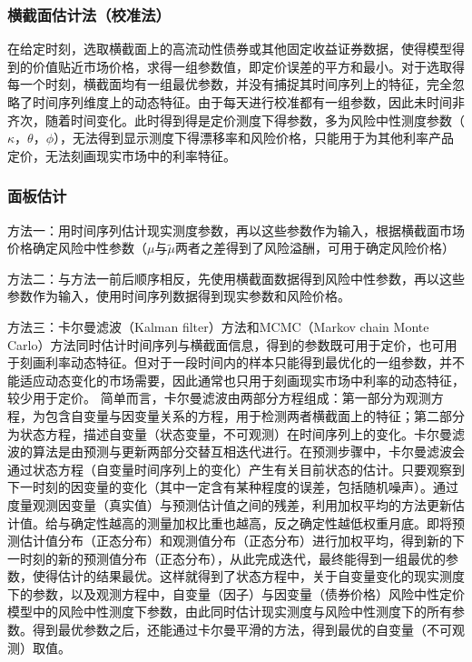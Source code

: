 \documentclass[11pt]{article}
\begin{document}
\subsubsection{横截面估计法（校准法）}

在给定时刻，选取横截面上的高流动性债券或其他固定收益证券数据，使得模型得到的价值贴近市场价格，求得一组参数值，即定价误差的平方和最小。对于选取得每一个时刻，横截面均有一组最优参数，并没有捕捉其时间序列上的特征，完全忽略了时间序列维度上的动态特征。由于每天进行校准都有一组参数，因此未时间非齐次，随着时间变化。此时得到得是定价测度下得参数，多为风险中性测度参数（$\kappa$，$\theta$，$\phi$），无法得到显示测度下得漂移率和风险价格，只能用于为其他利率产品定价，无法刻画现实市场中的利率特征。

\subsubsection{面板估计}

方法一：用时间序列估计现实测度参数，再以这些参数作为输入，根据横截面市场价格确定风险中性参数（$\mu$与$\tilde{\mu}$两者之差得到了风险溢酬，可用于确定风险价格）

方法二：与方法一前后顺序相反，先使用横截面数据得到风险中性参数，再以这些参数作为输入，使用时间序列数据得到现实参数和风险价格。

方法三：卡尔曼滤波（Kalman filter）方法和MCMC（Markov chain Monte Carlo）方法同时估计时间序列与横截面信息，得到的参数既可用于定价，也可用于刻画利率动态特征。但对于一段时间内的样本只能得到最优化的一组参数，并不能适应动态变化的市场需要，因此通常也只用于刻画现实市场中利率的动态特征，较少用于定价。
简单而言，卡尔曼滤波由两部分方程组成：第一部分为观测方程，为包含自变量与因变量关系的方程，用于检测两者横截面上的特征；第二部分为状态方程，描述自变量（状态变量，不可观测）在时间序列上的变化。卡尔曼滤波的算法是由预测与更新两部分交替互相迭代进行。在预测步骤中，卡尔曼滤波会通过状态方程（自变量时间序列上的变化）产生有关目前状态的估计。只要观察到下一时刻的因变量的变化（其中一定含有某种程度的误差，包括随机噪声）。通过度量观测因变量（真实值）与预测估计值之间的残差，利用加权平均的方法更新估计值。给与确定性越高的测量加权比重也越高，反之确定性越低权重月底。即将预测估计值分布（正态分布）和观测值分布（正态分布）进行加权平均，得到新的下一时刻的新的预测值分布（正态分布），从此完成迭代，最终能得到一组最优的参数，使得估计的结果最优。这样就得到了状态方程中，关于自变量变化的现实测度下的参数，以及观测方程中，自变量（因子）与因变量（债券价格）风险中性定价模型中的风险中性测度下参数，由此同时估计现实测度与风险中性测度下的所有参数。得到最优参数之后，还能通过卡尔曼平滑的方法，得到最优的自变量（不可观测）取值。
\end{document}
